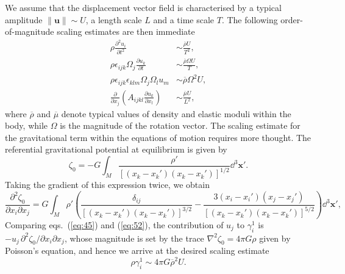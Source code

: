 We assume that the displacement vector field is 
characterised by a typical amplitude $\|\mathbf{u}\|\sim U$, a length scale $L$ and a time scale $T$. The following 
order-of-magnitude scaling estimates are then immediate
\begin{align}
\rho\frac{\partial^{2}u_{i}}{\partial t^{2}}&\sim\frac{\overline{\rho}U}{T^{2}}, \label{eq:47} \\
\rho\epsilon_{ijk}\Omega_{j}\frac{\partial u_{k}}{\partial t}&\sim\frac{\overline{\rho}\Omega U}{T}, \label{eq:48} \\
\rho\epsilon_{ijk}\epsilon_{klm}\Omega_{j}\Omega_{l}u_{m}&\sim\overline{\rho}\Omega^{2}U, \label{eq:49} \\
\frac{\partial}{\partial x_{j}}\left(A_{ijkl}\frac{\partial u_{k}}{\partial x_{l}}\right)&\sim\frac{\overline{\mu}U}{L^{2}}, \label{eq:50}
\end{align}
where $\overline{\rho}$ and $\overline{\mu}$ denote typical values of density and elastic moduli within the body, 
while $\Omega$ is the magnitude of the rotation vector. The scaling estimate for the gravitational term within 
the equations of motion requires more thought. The referential gravitational potential at equilibrium is given by
\begin{equation}
\zeta_{0}=-G\int_{M}\frac{\rho'}{[(x_{k}-x_{k}')(x_{k}-x_{k}')]^{1/2}}\dd^{3}\mathbf{x}'.
\label{eq:51}
\end{equation}
Taking the gradient of this expression twice, we obtain
\begin{equation}
\frac{\partial^{2}\zeta_{0}}{\partial x_{i}\partial x_{j}}=G\int_{M}\rho'\left(\frac{\delta_{ij}}{[(x_{k}-x_{k}')
(x_{k}-x_{k}')]^{3/2}}-\frac{3(x_{i}-x_{i}')(x_{j}-x_{j}')}{[(x_{k}-x_{k}')(x_{k}-x_{k}')]^{5/2}}\right)\dd^{3}\mathbf{x}',
\label{eq:52}
\end{equation}
Comparing eqs.~(\ref{eq:45}) and (\ref{eq:52}), the contribution of $u_{j}$ to $\gamma_{i}^{1}$ is
$-u_{j}\,\partial^{2}\zeta_{0}/\partial x_{i}\partial x_{j}$, whose magnitude is set by the trace $\nabla^{2}\zeta_{0}=4\pi G\rho$
given by Poisson's equation, and hence we arrive at the desired scaling estimate
\begin{equation}
\rho\gamma_{i}^{1}\sim4\pi G\overline{\rho}^{2}U.
\label{eq:53}
\end{equation}

